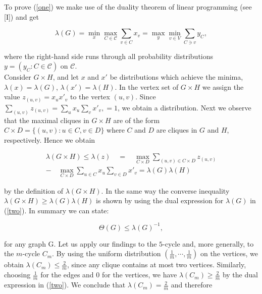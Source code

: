 To prove (\ref{one}) we make use of the duality theorem of linear programming 
(see [I]) and get

\begin{equation}
  \lambda(G) = \min_x\max_{C \in \mathcal{C}} \sum_{v\in C} x_v = \max_y\min_{v \in V}\sum_{C \ni v}y_C, \label{two}
\end{equation}

where the right-hand side runs through all probability distributions $y = (y_C : C \in \mathcal{C})$
on $\mathcal{C}$.\\
Consider $G \times H$, and let $x$ and $x'$ be distributions which achieve the 
minima, $\lambda(x) = \lambda(G)$, $\lambda(x') = \lambda(H)$. In the vertex set of $G \times H$ we 
assign the value $z_{(u,v)} = x_ux'_v$ to the vertex $(u, v)$. Since $\sum_{(u,v)}z_{(u,v)} = \sum_u x_u \sum_v x'_v, = 1$, 
we obtain a distribution. Next we observe that the maximal cliques in 
$G \times H$ are of the form $C \times D = \{(u, v) : u \in C, v \in D \} $
where $C$ and $D$ are cliques in $G$ and $H$, respectively. Hence we obtain 

\begin{equation*}
  \begin{align}
  \lambda(G \times H) \leq \lambda(z)\quad =\quad \max_{C \times D} \sum_{(u,v) \in C \times D} z_(u,v)\\
  -\quad \max_{C \times D} \sum_{u\in C} x_u \sum_{v \in D} x'_v = \lambda(G)\lambda(H)
  \end{align}
\end{equation*}

\setnewpagemargins

by the definition of $\lambda(G \times H)$. In the same way the converse inequality 
$\lambda(G \times H) \geq \lambda(G)\lambda(H)$ is shown by using the dual expression for $\lambda(G)$ 
in (\ref{two}). In summary we can state: 

\begin{equation*}
  \Theta(G) \leq \lambda(G)^{-1},
\end{equation*}

for any graph G.
Let us apply our findings to the $5$-cycle and, more generally, to the $m$-cycle $C_m$.
By using the uniform distribution $(\frac{1}{m},\dotsb,\frac{1}{m})$ on the 
vertices, we obtain $\lambda(C_m) \leq \frac{2}{m} $, since any clique contains at most two 
vertices. Similarly, choosing $\frac{1}{m}$ for the edges and $0$ for the vertices, we have 
$\lambda(C_m) \geq \frac{2}{m}$ by the dual expression in (\ref{two}). We conclude that $\lambda(C_m) = \frac{2}{m}$ 
and therefore 

